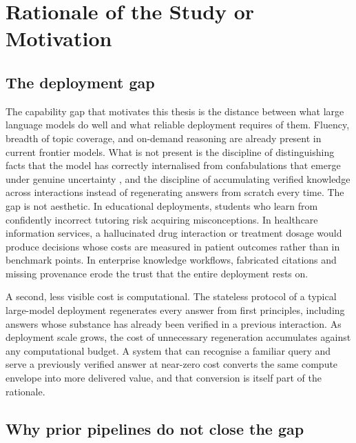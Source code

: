 \section{Rationale of the Study or Motivation}
\label{sec:rationale}

\subsection{The deployment gap}
\label{sec:deployment-gap}

The capability gap that motivates this thesis is the distance between what large language models do well and what reliable deployment requires of them. Fluency, breadth of topic coverage, and on-demand reasoning are already present in current frontier models. What is not present is the discipline of distinguishing facts that the model has correctly internalised from confabulations that emerge under genuine uncertainty \cite{farquhar2024semantic}, and the discipline of accumulating verified knowledge across interactions instead of regenerating answers from scratch every time. The gap is not aesthetic. In educational deployments, students who learn from confidently incorrect tutoring risk acquiring misconceptions. In healthcare information services, a hallucinated drug interaction or treatment dosage would produce decisions whose costs are measured in patient outcomes rather than in benchmark points. In enterprise knowledge workflows, fabricated citations and missing provenance erode the trust that the entire deployment rests on.

A second, less visible cost is computational. The stateless protocol of a typical large-model deployment regenerates every answer from first principles, including answers whose substance has already been verified in a previous interaction. As deployment scale grows, the cost of unnecessary regeneration accumulates against any computational budget. A system that can recognise a familiar query and serve a previously verified answer at near-zero cost converts the same compute envelope into more delivered value, and that conversion is itself part of the rationale.

\subsection{Why prior pipelines do not close the gap}
\label{sec:prior-pipelines}

